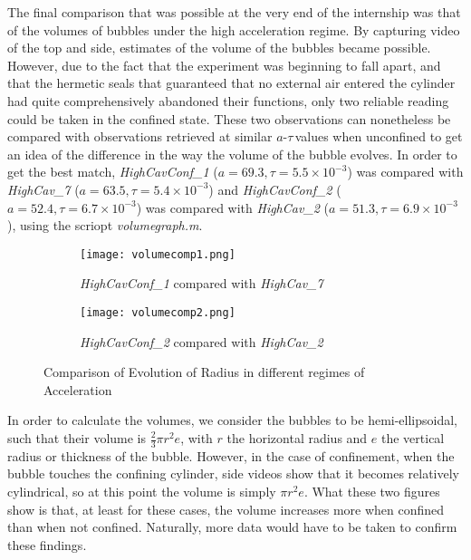 \documentclass{article}
\newcommand{\at}{$a$-$\tau$\,}
\begin{document}
The final comparison that was possible at the very end of the internship was that of the volumes of bubbles under the high acceleration regime. By capturing video of the top and side, estimates of the volume of the bubbles became possible. However, due to the fact that the experiment was beginning to fall apart, and that the hermetic seals that guaranteed that no external air entered the cylinder had quite comprehensively abandoned their functions, only two reliable reading could be taken in the confined state. These two observations can nonetheless be compared with observations retrieved at similar \at values when unconfined to get an idea of the difference in the way the volume of the bubble evolves. In order to get the best match, \emph{HighCavConf\_1} ($a = 69.3, \tau = 5.5 \times 10^{-3}$) was compared with \emph{HighCav\_7} ($a = 63.5, \tau = 5.4 \times 10^{-3}$) and \emph{HighCavConf\_2} ($a = 52.4, \tau = 6.7 \times 10^{-3}$) was compared with \emph{HighCav\_2} ($a = 51.3, \tau = 6.9 \times 10^{-3}$), using the scriopt \emph{volumegraph.m}.
\begin{figure}[H]
  \centering
  \begin{subfigure}[b]{0.49\linewidth}
    \texttt{[image: volumecomp1.png]}
    \caption{\emph{HighCavConf\_1} compared with \emph{HighCav\_7}}
  \end{subfigure}
  \begin{subfigure}[b]{0.49\linewidth}
    \texttt{[image: volumecomp2.png]}
    \caption{\emph{HighCavConf\_2} compared with \emph{HighCav\_2}}
  \end{subfigure}
  \caption{Comparison of Evolution of Radius in different regimes of Acceleration}
\end{figure}
In order to calculate the volumes, we consider the bubbles to be hemi-ellipsoidal, such that their volume is $\frac{2}{3}\pi r^2e$, with $r$ the horizontal radius and $e$ the vertical radius or thickness of the bubble. However, in the case of confinement, when the bubble touches the confining cylinder, side videos show that it becomes relatively cylindrical, so at this point the volume is simply $\pi r^2e$. What these two figures show is that, at least for these cases, the volume increases more when confined than when not confined. Naturally, more data would have to be taken to confirm these findings.
\end{document}
